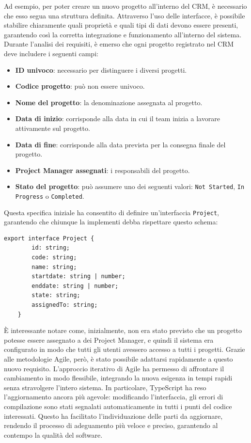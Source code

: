 \documentclass[target=bach,aauheader=,style=]{thud}
\begin{document}
\noindent Ad esempio, per poter creare un nuovo progetto all'interno del CRM, è necessario che esso segua una struttura definita. Attraverso l'uso delle interfacce, è possibile stabilire chiaramente quali proprietà e quali tipi di dati devono essere presenti, garantendo così la corretta integrazione e funzionamento all'interno del sistema. Durante l'analisi dei requisiti, è emerso che ogni progetto registrato nel CRM deve includere i seguenti campi:

\begin{itemize}
    \item \textbf{ID univoco}: necessario per distinguere i diversi progetti.
    \item \textbf{Codice progetto}: può non essere univoco.
    \item \textbf{Nome del progetto}: la denominazione assegnata al progetto.
    \item \textbf{Data di inizio}: corrisponde alla data in cui il team inizia a lavorare attivamente sul progetto.
    \item \textbf{Data di fine}: corrisponde alla data prevista per la consegna finale del progetto.
    \item \textbf{Project Manager assegnati}: i responsabili del progetto.
    \item \textbf{Stato del progetto}: può assumere uno dei seguenti valori: \texttt{Not Started}, \texttt{In Progress} o \texttt{Completed}.
    
\end{itemize}

\noindent Questa specifica iniziale ha consentito di definire un'interfaccia \texttt{Project}, garantendo che chiunque la implementi debba rispettare questo schema:

\begin{lstlisting}[language=React, caption=Interfaccia di progetto]
    export interface Project {
        id: string;
        code: string;
        name: string;
        startdate: string | number;
        enddate: string | number;
        state: string;
        assignedTo: string;
    }
\end{lstlisting}

\noindent È interessante notare come, inizialmente, non era stato previsto che un progetto potesse essere assegnato a dei Project Manager, e quindi il sistema era configurato in modo che tutti gli utenti avessero accesso a tutti i progetti. Grazie alle metodologie Agile, però, è stato possibile adattarsi rapidamente a questo nuovo requisito. L'approccio iterativo di Agile ha permesso di affrontare il cambiamento in modo flessibile, integrando la nuova esigenza in tempi rapidi senza stravolgere l'intero sistema. In particolare, TypeScript ha reso l'aggiornamento ancora più agevole: modificando l'interfaccia, gli errori di compilazione sono stati segnalati automaticamente in tutti i punti del codice interessati. Questo ha facilitato l'individuazione delle parti da aggiornare, rendendo il processo di adeguamento più veloce e preciso, garantendo al contempo la qualità del software.
\end{document}
